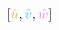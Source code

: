 \documentclass[preview]{standalone}
\begin{document}
$\left[\textcolor[HTML]{d7b760}{\hat{u}}, \textcolor[HTML]{46c6d9}{\hat{v}}, \textcolor[HTML]{d290cd}{\hat{w}}\right]$
\end{document}
